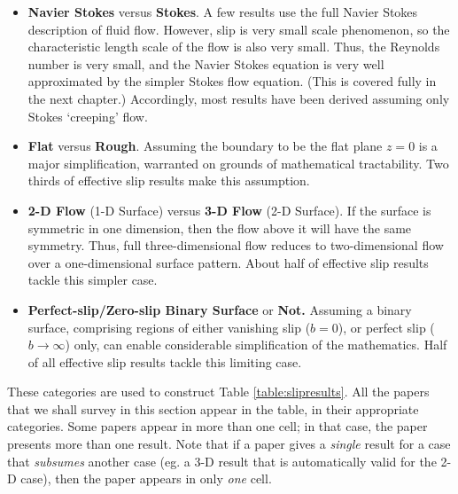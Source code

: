 \documentclass[12pt, a4paper, twoside, openright]{book}
\begin{document}
\begin{itemize}

\item \textbf{Navier Stokes} versus \textbf{Stokes}.  A few results use the full Navier Stokes description of fluid flow.  However, slip is very small scale phenomenon, so the characteristic length scale of the flow is also very small.  Thus, the Reynolds number is very small, and the Navier Stokes equation is very well approximated by the simpler Stokes flow equation.  (This is covered fully in the next chapter.)  Accordingly, most results have been derived assuming only Stokes `creeping' flow.

\item \textbf{Flat} versus \textbf{Rough}. Assuming the boundary to be the flat plane $z=0$ is a major simplification, warranted on grounds of mathematical tractability.  Two thirds of effective slip results make this assumption.

\item \textbf{2-D Flow} (1-D Surface) versus \textbf{3-D Flow} (2-D Surface).
If the surface is symmetric in one dimension, then the flow above it will have the same symmetry.  Thus, full three-dimensional flow reduces to two-dimensional flow over a one-dimensional surface pattern.  About half of effective slip results tackle this simpler case.

\item \textbf{Perfect-slip/Zero-slip Binary Surface} or \textbf{Not.}  Assuming a binary surface, comprising regions of either vanishing slip ($b=0$), or perfect slip ($b \rightarrow \infty$) only, can enable considerable simplification of the mathematics.  Half of all effective slip results tackle this limiting case.

\end{itemize}

These categories are used to construct Table \ref{table:slipresults}.  All the papers that we shall survey in this section appear in the table, in their appropriate categories.  Some papers appear in more than one cell; in that case, the paper presents more than one result.  Note that if a paper gives a \emph{single} result for a case that \emph{subsumes} another case (eg. a 3-D result that is automatically valid for the 2-D case), then the paper appears in only \emph{one} cell.
\end{document}
